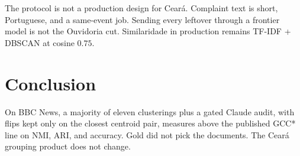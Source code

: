 \documentclass[acmlarge,screen]{acmart}
\begin{document}
The protocol is not a production design for Cear\'{a}. Complaint text is short, Portuguese, and a same-event job. Sending every leftover through a frontier model is not the Ouvidoria cut. Similaridade in production remains TF-IDF + DBSCAN at cosine $0.75$.

\section{Conclusion}

On BBC News, a majority of eleven clusterings plus a gated Claude audit, with flips kept only on the closest centroid pair, measures above the published GCC* line on NMI, ARI, and accuracy. Gold did not pick the documents. The Cear\'{a} grouping product does not change.



\end{document}
